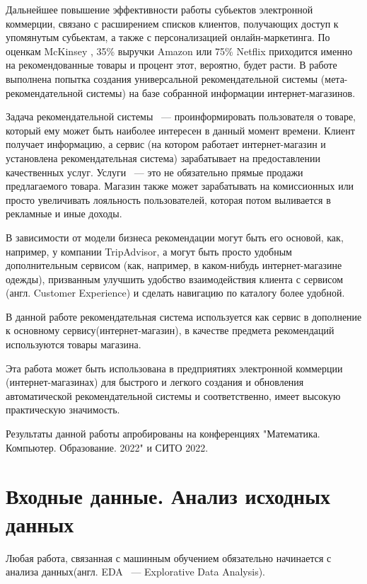 \documentclass[14pt]{mmcs_article}
\begin{document}
Дальнейшее повышение эффективности работы субьектов электронной коммерции, связано с расширением списков клиентов, получающих доступ к упомянутым субьектам, а также с персонализацией онлайн-маркетинга. По оценкам McKinsey \cite{INTRO:a1}, 35\% выручки Amazon или 75\% Netflix приходится именно на рекомендованные товары и процент этот, вероятно, будет расти. В работе выполнена попытка создания универсальной рекомендательной системы (мета-рекомендательной системы) на базе собранной информации интернет-магазинов. 

Задача рекомендательной системы ~--- проинформировать пользователя о товаре, который ему может быть наиболее интересен в данный момент времени. Клиент получает информацию, а сервис (на котором работает интернет-магазин и установлена рекомендательная система) зарабатывает на предоставлении качественных услуг. Услуги ~--- это не обязательно прямые продажи предлагаемого товара. Магазин также может зарабатывать на комиссионных или просто увеличивать лояльность пользователей, которая потом выливается в рекламные и иные доходы.

В зависимости от модели бизнеса рекомендации могут быть его основой, как, например, у компании TripAdvisor, а могут быть просто удобным дополнительным сервисом (как, например, в каком-нибудь интернет-магазине одежды), призванным улучшить удобство взаимодействия клиента с сервисом (англ. Customer Experience) и сделать навигацию по каталогу более удобной. 

В данной работе рекомендательная система используется как сервис в дополнение к основному сервису(интернет-магазин), в качестве предмета рекомендаций используются товары магазина. 

Эта работа может быть использована в предприятиях электронной коммерции (интернет-магазинах) для быстрого и легкого создания и обновления автоматической рекомендательной системы и соответственно, имеет высокую практическую значимость.

Результаты данной работы апробированы на конференциях "Математика. Компьютер. Образование. 2022" и СИТО 2022.

\newpage


\section{Входные данные. Анализ исходных данных}\label{dsfs}
Любая работа, связанная с машинным обучением обязательно начинается с анализа данных(англ. EDA ~--- Explorative Data Analysis).
\end{document}
